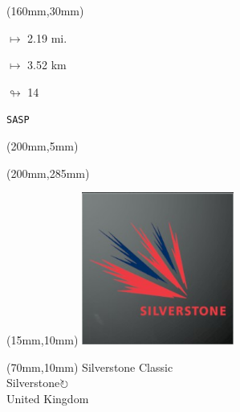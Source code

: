\begin{textblock*}{40mm}(160mm,30mm)%
\Large
\par$\mapsto$ 2.19 mi.
\par$\mapsto$ 3.52 km
\par$\looparrowright$ 14
\par\hfill\tiny\tt SASP\\
\end{textblock*}
\begin{textblock*}{20mm}(200mm,5mm)%
\fbox{\thepage}
\label{SASP}
\end{textblock*}
\begin{textblock*}{20mm}(200mm,285mm)%
\fbox{\thepage}
\end{textblock*}

\null\newpage
\begin{textblock*}{50mm}(15mm,10mm)%
\includegraphics[width=50mm]{LG/2015-05-20_00094.png}
\end{textblock*}
\begin{textblock*}{130mm}(70mm,10mm)%
{\fontsize{20}{20}\selectfont Silverstone Classic\\}
{\fontsize{16}{16}\selectfont Silverstone\hfill \Large$\circlearrowright$\\}
{\fontsize{12}{12}\selectfont United Kingdom\\}
\end{textblock*}
